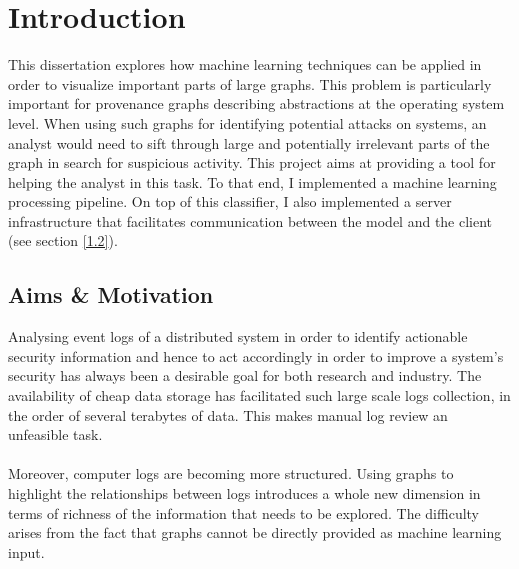 
	
	\chapter{Introduction}
	
	This dissertation explores how machine learning techniques can be applied in order to visualize important parts of large graphs. This problem is particularly important for provenance graphs describing abstractions at the operating system level. When using such graphs for identifying potential attacks on systems, an analyst would need to sift through large and potentially irrelevant parts of the graph in search for suspicious activity. This project aims at providing a tool for helping the analyst in this task. To that end, I implemented a machine learning processing pipeline. On top of this classifier, I also implemented a server infrastructure that facilitates communication between the model and the client (see section \ref{1.2}). 
	
	\section{Aims \& Motivation}  \label{1.1}
	Analysing event logs of a distributed system in order to identify actionable security information and hence to act accordingly in order to improve a system's security has always been a desirable goal for both research and industry. The availability of cheap data storage has facilitated such large scale logs collection, in the order of several terabytes of data. This makes manual log review an unfeasible task. 
	\\ \\
	Moreover, computer logs are becoming more structured. Using graphs to highlight the relationships between logs introduces a whole new dimension in terms of richness of the information that needs to be explored. The difficulty arises from the fact that graphs cannot be directly provided as machine learning input.
	
